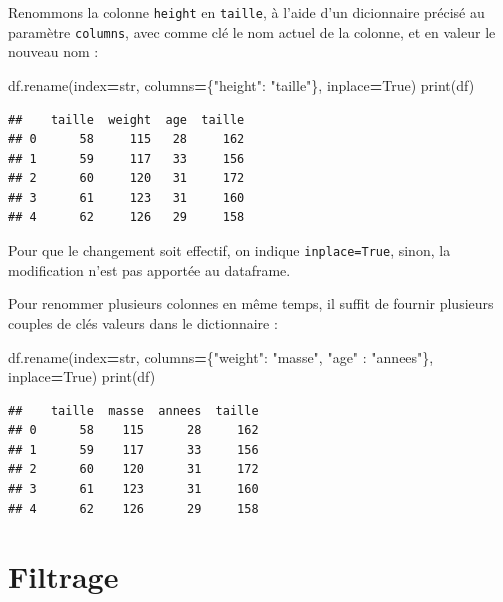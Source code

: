 \documentclass[12pt,]{book}
\newenvironment{Shaded}{\begin{snugshade}}{\end{snugshade}}
\newcommand{\StringTok}[1]{\textcolor[rgb]{0.31,0.60,0.02}{#1}}
\newcommand{\VariableTok}[1]{\textcolor[rgb]{0.00,0.00,0.00}{#1}}
\newcommand{\OperatorTok}[1]{\textcolor[rgb]{0.81,0.36,0.00}{\textbf{#1}}}
\newcommand{\BuiltInTok}[1]{#1}
\newcommand{\NormalTok}[1]{#1}
\numberwithin{equation}{section}
\numberwithin{countremarque}{section}
\begin{document}
Renommons la colonne \texttt{height} en \texttt{taille}, à l'aide d'un
dicionnaire précisé au paramètre \texttt{columns}, avec comme clé le nom
actuel de la colonne, et en valeur le nouveau nom :

\begin{Shaded}
\begin{Highlighting}[]
\NormalTok{df.rename(index}\OperatorTok{=}\BuiltInTok{str}\NormalTok{, columns}\OperatorTok{=}\NormalTok{\{}\StringTok{"height"}\NormalTok{: }\StringTok{"taille"}\NormalTok{\}, inplace}\OperatorTok{=}\VariableTok{True}\NormalTok{)}
\BuiltInTok{print}\NormalTok{(df)}
\end{Highlighting}
\end{Shaded}

\begin{lstlisting}
##    taille  weight  age  taille
## 0      58     115   28     162
## 1      59     117   33     156
## 2      60     120   31     172
## 3      61     123   31     160
## 4      62     126   29     158
\end{lstlisting}

Pour que le changement soit effectif, on indique \texttt{inplace=True},
sinon, la modification n'est pas apportée au dataframe.

Pour renommer plusieurs colonnes en même temps, il suffit de fournir
plusieurs couples de clés valeurs dans le dictionnaire :

\begin{Shaded}
\begin{Highlighting}[]
\NormalTok{df.rename(index}\OperatorTok{=}\BuiltInTok{str}\NormalTok{,}
\NormalTok{          columns}\OperatorTok{=}\NormalTok{\{}\StringTok{"weight"}\NormalTok{: }\StringTok{"masse"}\NormalTok{, }\StringTok{"age"}\NormalTok{ : }\StringTok{"annees"}\NormalTok{\},}
\NormalTok{          inplace}\OperatorTok{=}\VariableTok{True}\NormalTok{)}
\BuiltInTok{print}\NormalTok{(df)}
\end{Highlighting}
\end{Shaded}

\begin{lstlisting}
##    taille  masse  annees  taille
## 0      58    115      28     162
## 1      59    117      33     156
## 2      60    120      31     172
## 3      61    123      31     160
## 4      62    126      29     158
\end{lstlisting}

\section{Filtrage}\label{filtrage}
\end{document}

